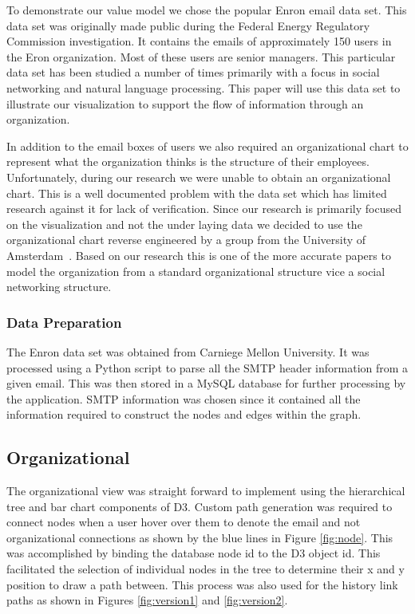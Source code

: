 \documentclass[journal]{vgtc}                %
\begin{document}
To demonstrate our value model we chose the popular Enron email data set.  This data set was originally made public during the Federal Energy Regulatory Commission investigation.  It contains the emails of approximately 150 users in the Eron organization.  Most of these users are senior managers.  This particular data set has been studied a number of times primarily with a focus in social networking and natural language processing.  This paper will use this data set to illustrate our visualization to support the flow of information through an organization.  

In addition to the email boxes of users we also required an organizational chart to represent what the organization thinks is the structure of their employees.  Unfortunately, during our research we were unable to obtain an organizational chart.  This is a well documented problem with the data set which has limited research against it for lack of verification.  Since our research is primarily focused on the visualization and not the under laying data we decided to use the organizational chart reverse engineered by a group from the University of Amsterdam~\cite{rowe2007automated}.  Based on our research this is one of the more accurate papers to model the organization from a standard organizational structure vice a social networking structure.

\subsubsection{Data Preparation}

The Enron data set was obtained from Carniege Mellon University.  It was processed using a Python script to parse all the SMTP header information from a given email.  This was then stored in a MySQL database for further processing by the application.  SMTP information was chosen since it contained all the information required to construct the nodes and edges within the graph.  

\subsection{Organizational}
The organizational view was straight forward to implement using the hierarchical tree and bar chart components of D3.  Custom path generation was required to connect nodes when a user hover over them to denote the email and not organizational connections as shown by the blue lines in Figure \ref{fig:node}.  This was accomplished by binding the database node id to the D3 object id.  This facilitated the selection of individual nodes in the tree to determine their x and y position to draw a path between.  This process was also used for the history link paths as shown in Figures \ref{fig:version1} and \ref{fig:version2}.
\end{document}
